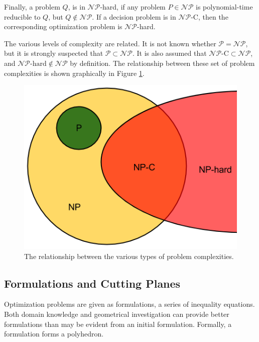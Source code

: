 Finally, a problem $Q$, is in $\mathcal{NP}$-hard, if any problem
$P \in \mathcal{NP}$ is polynomial-time reducible to $Q$, but
$Q \not\in \mathcal{NP}$. If a decision problem is in $\mathcal{NP}$-C, then the
corresponding optimization problem is $\mathcal{NP}$-hard.

The various levels of complexity are related. It is not known whether
$\mathcal{P} = \mathcal{NP}$, but it is strongly suspected that
$\mathcal{P} \subset \mathcal{NP}$. It is also assumed that
$\mathcal{NP}\text{-C} \subset \mathcal{NP}$, and
$\mathcal{NP}\text{-hard} \notin \mathcal{NP}$ by definition. The relationship
between these set of problem complexities is shown graphically in
Figure \ref{fig:complexity}.

\begin{figure}[H]
  \begin{center}
    \includegraphics[width=\linewidth]{./chapters/litreview/complexity.png}
  \caption{The relationship between the various types of problem complexities.}
  \label{fig:complexity}
  \end{center}
\end{figure}


\subsection{Formulations and Cutting Planes}\label{sec:formulations}

Optimization problems are given as formulations, a series of inequality
equations. Both domain knowledge and geometrical investigation can provide
better formulations than may be evident from an initial formulation. Formally, a
formulation forms a polyhedron.


